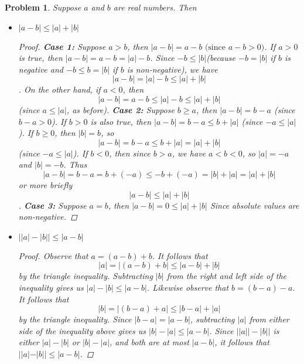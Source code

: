 \documentclass[12pt]{article}
\newtheorem{problem}{Problem}
\begin{document}
\begin{problem} %
Suppose $a$ and $b$ are real numbers.  Then
\begin{itemize}
\item[(a)] $|a-b| \le |a|+|b|$
	\begin{proof}
		\textbf{Case 1:} Suppose $a > b$, then $|a - b| = a - b \text{ (since $a-b > 0$)}$. If $a > 0$ is true, then $|a - b| = a - b = |a| - b$. Since $-b \leq |b|$(because $-b = |b|$ if $b$ is negative and $-b \leq b = |b|$ if $b$ is non-negative), we have $$|a - b| = |a| - b \leq |a| + |b|$$. On the other hand, if $a < 0$, then $$|a - b| = a - b \leq |a| - b \leq |a| + |b|$$ (since $a \leq |a|$, as before). \newline
		\textbf{Case 2:} Suppose $b \geq a$, then $|a - b| = b - a$ (since $b - a > 0$). If $b > 0$ is also true, then $|a-b| = b- a \leq b + |a|$ (since $-a \leq |a|$). \newline
		If $b \geq 0$, then $|b| = b$, so $$|a-b| = b - a \leq b + |a| = |a| + |b| $$ (since $-a \leq |a|$). \newline If $b < 0$, then since $b > a$, we have $a < b < 0$, so $|a| = -a$ and $|b| = -b$. Thus $$|a-b| = b - a = b + (-a) \leq -b + (-a) = |b| + |a| = |a|+|b|$$ or more briefly
		$$|a-b| \leq |a | + |b|$$. \newline
		\textbf{Case 3:} Suppose $a = b$, then $|a - b| = 0 \leq |a| + |b|$ Since absolute values are non-negative.
	\end{proof}
\item[(b)] $\big||a|-|b|\big| \le |a-b|$
	\begin{proof}
		Observe that $a = (a - b) + b$. It follows that
		$$	|a| = |(a - b) + b| \leq |a - b| + |b|$$
		by the triangle inequality. Subtracting $|b|$ from the right and left side of the inequality gives us
		$|a| - |b| \leq |a - b|$. Likewise observe that $b = (b - a) - a$. It follows that
		$$ |b| = |(b-a) + a| \leq |b - a| + |a|$$ by the triangle inequality. Since $|b - a | = |a - b|$, subtracting $|a|$ from either side of the inequality above gives us $|b| - |a| \leq |a - b|$. Since $||a|| - |b||$ is either $|a| - |b|$ or $|b| - |a|$, and both are at most $|a - b|$, it follows that $||a| - |b|| \leq |a - b|$.
	\end{proof}
\end{itemize}
\end{problem}

\end{document}
